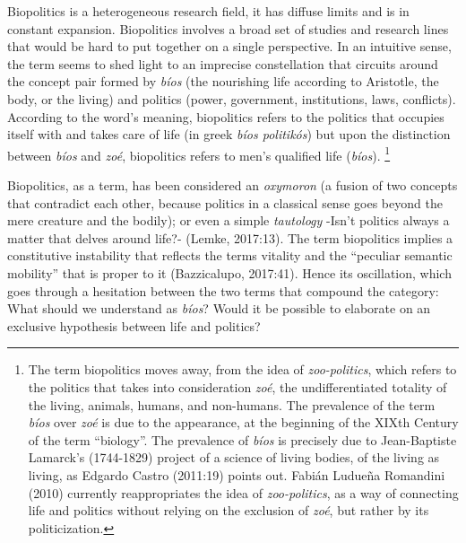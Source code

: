 \documentclass[a4paper,]{scrartcl}
\begin{document}
Biopolitics is a heterogeneous research field, it has diffuse limits and
is in constant expansion. Biopolitics involves a broad set of studies
and research lines that would be hard to put together on a single
perspective. In an intuitive sense, the term seems to shed light to an
imprecise constellation that circuits around the concept pair formed by
\emph{bíos} (the nourishing life according to Aristotle, the body, or
the living) and politics (power, government, institutions, laws,
conflicts). According to the word's meaning, biopolitics refers to the
politics that occupies itself with and takes care of life (in greek
\emph{bíos politikós}) but upon the distinction between \emph{bíos} and
\emph{zoé}, biopolitics refers to men's qualified life (\emph{bíos}).
\footnote{The term biopolitics moves away, from the idea of
  \emph{zoo-politics}, which refers to the politics that takes into
  consideration \emph{zoé}, the undifferentiated totality of the living,
  animals, humans, and non-humans. The prevalence of the term
  \emph{bíos} over \emph{zoé} is due to the appearance, at the beginning
  of the XIXth Century of the term ``biology''. The prevalence of
  \emph{bíos} is precisely due to Jean-Baptiste Lamarck's (1744-1829)
  project of a science of living bodies, of the living as living, as
  Edgardo Castro (2011:19) points out. Fabián Ludueña Romandini (2010)
  currently reappropriates the idea of \emph{zoo-politics}, as a way of
  connecting life and politics without relying on the exclusion of
  \emph{zoé}, but rather by its politicization.}

Biopolitics, as a term, has been considered an \emph{oxymoron} (a fusion
of two concepts that contradict each other, because politics in a
classical sense goes beyond the mere creature and the bodily); or even a
simple \emph{tautology} -Isn't politics always a matter that delves
around life?- (Lemke, 2017:13). The term biopolitics implies a
constitutive instability that reflects the terms vitality and the
``peculiar semantic mobility'' that is proper to it (Bazzicalupo,
2017:41). Hence its oscillation, which goes through a hesitation between
the two terms that compound the category: What should we understand as
\emph{bíos}? Would it be possible to elaborate on an exclusive
hypothesis between life and politics?
\end{document}
